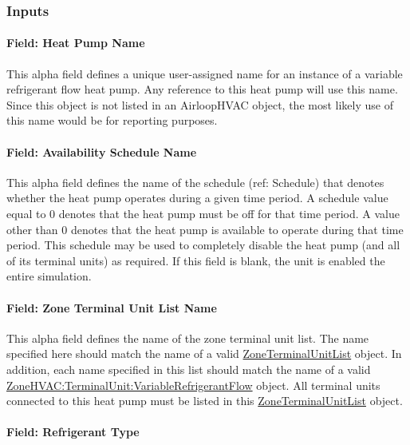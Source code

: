 \subsubsection{Inputs}\label{inputs-1-048}

\paragraph{Field: Heat Pump Name}\label{field-heat-pump-name-1}

This alpha field defines a unique user-assigned name for an instance of a variable refrigerant flow heat pump. Any reference to this heat pump will use this name. Since this object is not listed in an AirloopHVAC object, the most likely use of this name would be for reporting purposes.

\paragraph{Field: Availability Schedule Name}\label{field-availability-schedule-name-1-013}

This alpha field defines the name of the schedule (ref: Schedule) that denotes whether the heat pump operates during a given time period. A schedule value equal to 0 denotes that the heat pump must be off for that time period. A value other than 0 denotes that the heat pump is available to operate during that time period. This schedule may be used to completely disable the heat pump (and all of its terminal units) as required. If this field is blank, the unit is enabled the entire simulation.

\paragraph{Field: Zone Terminal Unit List Name}\label{field-zone-terminal-unit-list-name-1}

This alpha field defines the name of the zone terminal unit list. The name specified here should match the name of a valid \hyperref[zoneterminalunitlist]{ZoneTerminalUnitList} object. In addition, each name specified in this list should match the name of a valid \hyperref[zonehvacterminalunitvariablerefrigerantflow]{ZoneHVAC:TerminalUnit:VariableRefrigerantFlow} object. All terminal units connected to this heat pump must be listed in this \hyperref[zoneterminalunitlist]{ZoneTerminalUnitList} object.

\paragraph{Field: Refrigerant Type}\label{field-refrigerant-type-000}

